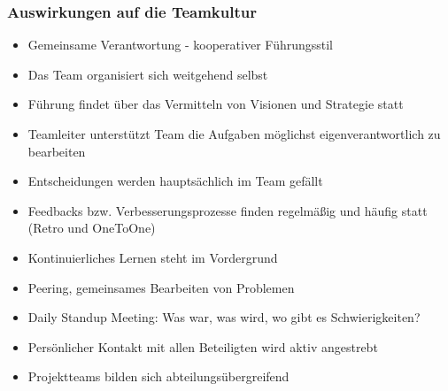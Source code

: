 \frame
{
  \frametitle{Auswirkungen auf die Teamkultur}
  \begin{itemize}
     \item{Gemeinsame Verantwortung - kooperativer Führungsstil}
     \item{Das Team organisiert sich weitgehend selbst}
     \item{Führung findet über das Vermitteln von Visionen und Strategie statt}
     \item{Teamleiter unterstützt Team die Aufgaben möglichst eigenverantwortlich zu bearbeiten}
     \item{Entscheidungen werden hauptsächlich im Team gefällt}
     \item{Feedbacks bzw. Verbesserungsprozesse finden regelmäßig und häufig statt (Retro und OneToOne)}
     \item{Kontinuierliches Lernen steht im Vordergrund}
     \item{Peering, gemeinsames Bearbeiten von Problemen}
     \item{Daily Standup Meeting: Was war, was wird, wo gibt es Schwierigkeiten?}
     \item{Persönlicher Kontakt mit allen Beteiligten wird aktiv angestrebt}
     \item{Projektteams bilden sich abteilungsübergreifend}
  \end{itemize}
}



